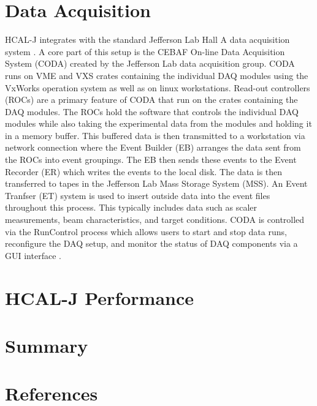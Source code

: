 \documentclass[review]{elsarticle}
\newcommand{\hcal}{HCAL-J }
\newcommand{\jlab}{Jefferson Lab }
\begin{document}
\section{Data Acquisition}
\label{daq}

\hcal integrates with the standard \jlab Hall A data acquisition system \cite{hall_a}. A core part of this setup is the CEBAF On-line Data Acquisition System (CODA) created by the \jlab data acquisition group. CODA runs on VME and VXS crates containing the individual DAQ modules using the VxWorks operation system as well as on linux workstations. Read-out controllers (ROCs) are a primary feature of CODA that run on the crates containing the DAQ modules. The ROCs hold the software that controls the individual DAQ modules while also taking the experimental data from the modules and holding it in a memory buffer. This buffered data is then transmitted to a workstation via network connection where the Event Builder (EB) arranges the data sent from the ROCs into event groupings. The EB then sends these events to the Event Recorder (ER) which writes the events to the local disk. The data is then transferred to tapes in the \jlab Mass Storage System (MSS). An Event Tranfser (ET) system is used to insert outside data into the event files throughout this process. This typically includes data such as scaler measurements, beam characteristics, and target conditions. CODA is controlled via the RunControl process which allows users to start and stop data runs, reconfigure the DAQ setup, and monitor the status of DAQ components via a GUI interface \cite{coda}.

\section{\hcal Performance}
\label{results}

\section{Summary}
\label{summary}

\section*{References}
\label{refs}


\end{document}

